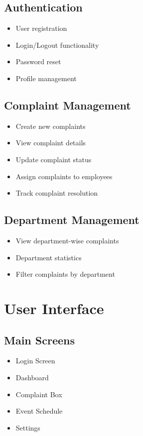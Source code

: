 \documentclass[12pt,a4paper]{article}
\begin{document}
\subsection{Authentication}
\begin{itemize}
    \item User registration
    \item Login/Logout functionality
    \item Password reset
    \item Profile management
\end{itemize}

\subsection{Complaint Management}
\begin{itemize}
    \item Create new complaints
    \item View complaint details
    \item Update complaint status
    \item Assign complaints to employees
    \item Track complaint resolution
\end{itemize}

\subsection{Department Management}
\begin{itemize}
    \item View department-wise complaints
    \item Department statistics
    \item Filter complaints by department
\end{itemize}

\section{User Interface}
\subsection{Main Screens}
\begin{itemize}
    \item Login Screen
    \item Dashboard
    \item Complaint Box
    \item Event Schedule
    \item Settings
\end{itemize}
\end{document}
